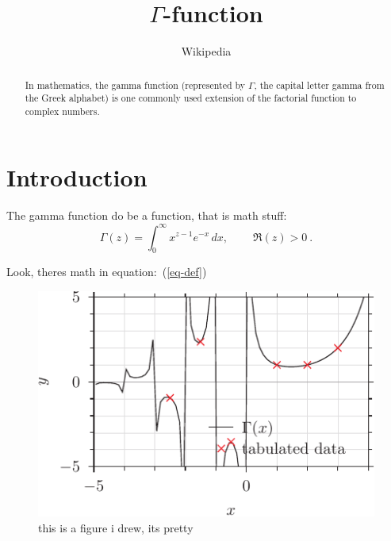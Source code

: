 \documentclass[twocolumn,a4paper]{article}
\begin{document}
\title{$\Gamma$-function}
\author{Wikipedia}

\maketitle

\begin{abstract}

	In mathematics, the gamma function (represented by $\Gamma$, the capital letter
gamma from the Greek alphabet) is one commonly used extension of the
factorial function to complex numbers.

\end{abstract}


\section{Introduction}

The gamma function do be a function, that is math stuff:
\begin{equation}\label{eq-def}
	\Gamma(z) = \int_0^\infty x^{z-1} e^{-x}\,dx, \ \qquad \Re(z) > 0\ .
\end{equation}

Look, theres math in equation:~(\ref{eq-def})
\begin{figure}[h!]
	\includegraphics[width=\linewidth]{gamma_pyx.pdf}
	\caption{this is a figure i drew, its pretty}
\end{figure}
\end{document}
